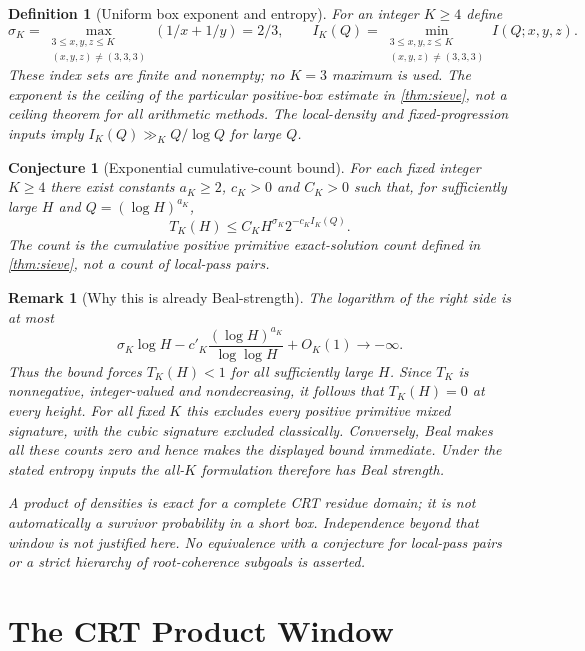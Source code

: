 \documentclass[11pt,a4paper]{article}
\newtheorem{conjecture}[theorem]{Conjecture}
\newtheorem{definition}[theorem]{Definition}
\newtheorem{remark}[theorem]{Remark}
\begin{document}
\begin{definition}[Uniform box exponent and entropy]
\label{def:sigmaK}
For an integer $K\ge4$ define
\[
 \sigma_K=\max_{\substack{3\le x,y,z\le K\\(x,y,z)\ne(3,3,3)}}
                       (1/x+1/y)=2/3,\qquad
 I_K(Q)=\min_{\substack{3\le x,y,z\le K\\(x,y,z)\ne(3,3,3)}}
                       I(Q;x,y,z).
\]
These index sets are finite and nonempty; no $K=3$ maximum is used.
The exponent is the ceiling of the particular positive-box estimate
in \cref{thm:sieve}, not a ceiling theorem for all arithmetic methods.
The local-density and fixed-progression inputs imply
$I_K(Q)\gg_K Q/\log Q$ for large $Q$.
\end{definition}

\begin{conjecture}[Exponential cumulative-count bound]
\label{conj:exp}
For each fixed integer $K\ge4$ there exist constants $a_K\ge2$,
$c_K>0$ and $C_K>0$ such that, for sufficiently large $H$ and
$Q=(\log H)^{a_K}$,
\[
 T_K(H)\le C_K H^{\sigma_K}2^{-c_K I_K(Q)}.
\]
The count is the cumulative positive primitive exact-solution count
defined in \cref{thm:sieve}, not a count of local-pass pairs.
\end{conjecture}

\begin{remark}[Why this is already Beal-strength]
The logarithm of the right side is at most
\[
 \sigma_K\log H-c'_K
       \frac{(\log H)^{a_K}}{\log\log H}+O_K(1)\longrightarrow-\infty.
\]
Thus the bound forces $T_K(H)<1$ for all sufficiently large $H$.
Since $T_K$ is nonnegative, integer-valued and nondecreasing,
it follows that $T_K(H)=0$ at \emph{every} height.
For all fixed $K$ this excludes every positive primitive mixed
signature, with the cubic signature excluded classically.
Conversely, Beal makes all these counts zero and hence makes the
displayed bound immediate. Under the stated entropy inputs the
all-$K$ formulation therefore has Beal strength.

A product of densities is exact for a complete CRT residue domain;
it is not automatically a survivor probability in a short box.
Independence beyond that window is not justified here.
No equivalence with a conjecture for local-pass pairs or a strict
hierarchy of root-coherence subgoals is asserted.
\end{remark}

\section{The CRT Product Window}
\label{sec:crt-window}
\end{document}
